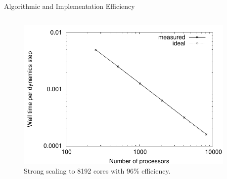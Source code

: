 \documentclass[final]{beamer}
\begin{document}
\begin{columns}[t]
\begin{column}{.32 \linewidth}
\begin{block}{\Large Algorithmic and Implementation Efficiency}
\begin{columns}[t]
\begin{column}{.48 \linewidth}
                        \begin{figure}[hctp]
                            \includegraphics[width=0.9 \linewidth]{images/scale.pdf}
                            \caption{Strong scaling to 8192 cores with 96\% efficiency.}
                        \end{figure}
                    \end{column}
                \end{columns}
            \end{block}

      \end{column}

      \begin{column}{.33 \linewidth}



\end{column}
\end{columns}
\end{document}
